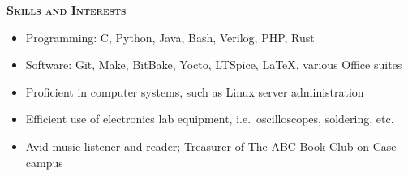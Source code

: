 \documentclass[12pt]{article}
\newcommand*{\titlefont}{\fontfamily{pnc}\selectfont}
\begin{document}
\vspace{-\topsep}

\bigbreak{}

%
%
%
%

\bigbreak{}

{\titlefont\large\textsc{\textbf{Skills and Interests}}}
\hrulefill{}\\
%
\vspace{-\topsep}
\begin{itemize}
    \setlength{\parskip}{0pt}
    \setlength{\itemsep}{0pt plus 1 pt}
    \item Programming: C, Python, Java, Bash, Verilog, PHP, Rust
    \item Software: Git, Make, BitBake, Yocto, LTSpice, LaTeX, various Office suites
    \item Proficient in computer systems, such as Linux server administration
    \item Efficient use of electronics lab equipment, i.e.\ oscilloscopes, soldering, etc.
    \item Avid music-listener and reader; Treasurer of The ABC Book Club on Case campus

\end{itemize}
\end{document}

